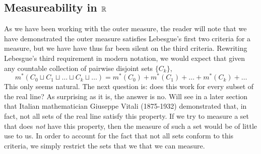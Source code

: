 \documentclass{article}
\theoremstyle{axiom} \newtheorem{axiom}{Axiom}
\theoremstyle{definition} \newtheorem{definition}{Definition}
\theoremstyle{example} \newtheorem{example}{Example}
\theoremstyle{proposition} \newtheorem{prop}{Proposition}
\theoremstyle{lemma} \newtheorem{lemma}{Lemma}
\begin{document}
\subsection{Measureability in $\mathbb{R}$}

As we have been working with the outer measure, the reader will note that we 
have demonstrated the outer measure satisfies Lebesgue's first two criteria 
for a measure, but we have have thus far been silent on the third criteria. 
Rewriting Lebesgue's third requirement in modern notation, we would expect that 
given any countable collection of pairwise disjoint  sets $\{C_k\}$,
\begin{equation*}
	m^*(C_0 \sqcup C_1 \sqcup \ldots \sqcup C_k \sqcup \ldots ) =  
	m^*(C_0)+m^*(C_1)+ \ldots + m^*(C_k) + \ldots 
\end{equation*}
This only seems natural. The next question is: does this work for every
subset of the real line? As surprising as it is, the answer is no. Will see 
in a later section that Italian mathematician Giuseppe Vitali (1875-1932) 
demonstrated that, in fact, not all sets of the real line satisfy this property.  
If we try to measure a set that does \textit{not} have this property, then the measure 
of such a set would be of little use to us. In order to account for the fact 
that not all sets conform to this criteria, we simply restrict the sets that we 
that we can measure. 
\end{document}
